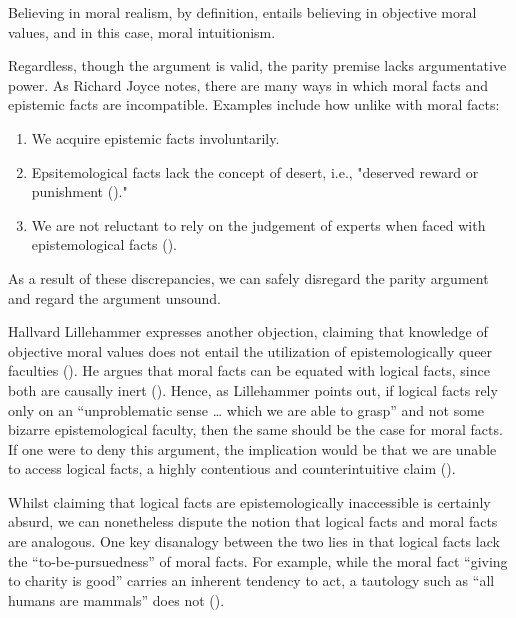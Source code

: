 \documentclass[12pt, a4paper, twoside]{article}
\begin{document}
Believing in moral realism, by definition, entails believing in objective moral values, and in this case, moral intuitionism. 

Regardless, though the argument is valid, the parity premise lacks argumentative power. As Richard Joyce notes, there are many ways in which moral facts and epistemic facts are incompatible. Examples include how unlike with moral facts: 

\begin{enumerate}

	\item We acquire epistemic facts involuntarily.

	\item Epsitemological facts lack the concept of desert, i.e., "deserved reward or punishment (\cite{merriam2024desert})."

	\item We are not reluctant to rely on the judgement of experts when faced with epistemological facts (\cite[pp.\ 14–16]{joyce2007evolution}).

\end{enumerate}

As a result of these discrepancies, we can safely disregard the parity argument and regard the argument unsound.  

Hallvard Lillehammer expresses another objection, claiming that knowledge of objective moral values does not entail the utilization of epistemologically queer faculties (\cite{balaguer2016platonism}). He argues that moral facts can be equated with logical facts, since both are causally inert (\cite{balaguer2016platonism}). Hence, as Lillehammer points out, if logical facts rely only on an “unproblematic sense … which we are able to grasp” and not some bizarre epistemological faculty, then the same should be the case for moral facts. If one were to deny this argument, the implication would be that we are unable to access logical facts, a highly contentious and counterintuitive claim (\cite[p.\ 6]{lillehammer2019queerness}). 

Whilst claiming that logical facts are epistemologically inaccessible is certainly absurd, we can nonetheless dispute the notion that logical facts and moral facts are analogous. One key disanalogy between the two lies in that logical facts lack the “to-be-pursuedness” of moral facts. For example, while the moral fact “giving to charity is good” carries an inherent tendency to act, a tautology such as “all humans are mammals” does not (\cite{britannica2024tautology}). 
\end{document}
